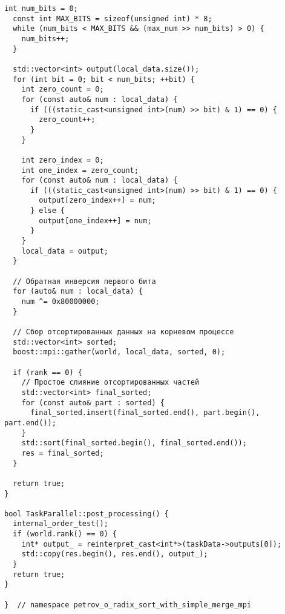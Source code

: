 \documentclass[12pt]{article}
\begin{document}
\begin{lstlisting}[caption={Файл реализации параллельной версии поразрядной сортировки}]
  int num_bits = 0;
  const int MAX_BITS = sizeof(unsigned int) * 8;
  while (num_bits < MAX_BITS && (max_num >> num_bits) > 0) {
    num_bits++;
  }

  std::vector<int> output(local_data.size());
  for (int bit = 0; bit < num_bits; ++bit) {
    int zero_count = 0;
    for (const auto& num : local_data) {
      if (((static_cast<unsigned int>(num) >> bit) & 1) == 0) {
        zero_count++;
      }
    }

    int zero_index = 0;
    int one_index = zero_count;
    for (const auto& num : local_data) {
      if (((static_cast<unsigned int>(num) >> bit) & 1) == 0) {
        output[zero_index++] = num;
      } else {
        output[one_index++] = num;
      }
    }
    local_data = output;
  }

  // Обратная инверсия первого бита
  for (auto& num : local_data) {
    num ^= 0x80000000;
  }

  // Сбор отсортированных данных на корневом процессе
  std::vector<int> sorted;
  boost::mpi::gather(world, local_data, sorted, 0);

  if (rank == 0) {
    // Простое слияние отсортированных частей
    std::vector<int> final_sorted;
    for (const auto& part : sorted) {
      final_sorted.insert(final_sorted.end(), part.begin(), part.end());
    }
    std::sort(final_sorted.begin(), final_sorted.end());
    res = final_sorted;
  }

  return true;
}

bool TaskParallel::post_processing() {
  internal_order_test();
  if (world.rank() == 0) {
    int* output_ = reinterpret_cast<int*>(taskData->outputs[0]);
    std::copy(res.begin(), res.end(), output_);
  }
  return true;
}

}  // namespace petrov_o_radix_sort_with_simple_merge_mpi
\end{lstlisting}
\end{document}
